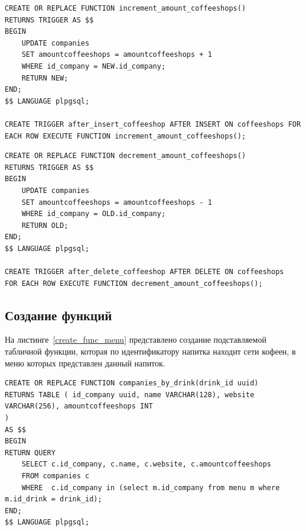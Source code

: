 \begin{center}
	\captionsetup{justification=raggedright,singlelinecheck=off}
	\begin{lstlisting}[label=create_trigger_incr,caption={Создание триггера, инкрементирующего значение поля amountcoffeeshops таблицы companies}]
CREATE OR REPLACE FUNCTION increment_amount_coffeeshops()
RETURNS TRIGGER AS $$
BEGIN
	UPDATE companies
	SET amountcoffeeshops = amountcoffeeshops + 1
	WHERE id_company = NEW.id_company;
	RETURN NEW;
END;
$$ LANGUAGE plpgsql;

CREATE TRIGGER after_insert_coffeeshop AFTER INSERT ON coffeeshops FOR EACH ROW EXECUTE FUNCTION increment_amount_coffeeshops();
	\end{lstlisting}
\end{center}

\begin{center}
	\captionsetup{justification=raggedright,singlelinecheck=off}
	\begin{lstlisting}[label=create_trigger_decr,caption={Создание триггера, декрементирующего значение поля amountcoffeeshops таблицы companies}]
CREATE OR REPLACE FUNCTION decrement_amount_coffeeshops()
RETURNS TRIGGER AS $$
BEGIN
	UPDATE companies
	SET amountcoffeeshops = amountcoffeeshops - 1
	WHERE id_company = OLD.id_company;
	RETURN OLD;
END;
$$ LANGUAGE plpgsql;

CREATE TRIGGER after_delete_coffeeshop AFTER DELETE ON coffeeshops
FOR EACH ROW EXECUTE FUNCTION decrement_amount_coffeeshops();
	\end{lstlisting}
\end{center}

\newpage
\subsection{Создание функций}
На листинге~\ref{create_func_menu} представлено создание подставляемой табличной функции, которая по идентификатору напитка находит сети кофеен, в меню которых представлен данный напиток.


\begin{center}
	\captionsetup{justification=raggedright,singlelinecheck=off}
	\begin{lstlisting}[label=create_func_menu,caption={Создание функции, которая по идентификатору напитка находит сети кофеен, в меню которых представлен этот напиток}]
CREATE OR REPLACE FUNCTION companies_by_drink(drink_id uuid)
RETURNS TABLE ( id_company uuid, name VARCHAR(128), website VARCHAR(256), amountcoffeeshops INT
) 
AS $$
BEGIN
RETURN QUERY
	SELECT c.id_company, c.name, c.website, c.amountcoffeeshops
	FROM companies c
	WHERE  c.id_company in (select m.id_company from menu m where m.id_drink = drink_id);
END;
$$ LANGUAGE plpgsql;
	\end{lstlisting}
\end{center}

